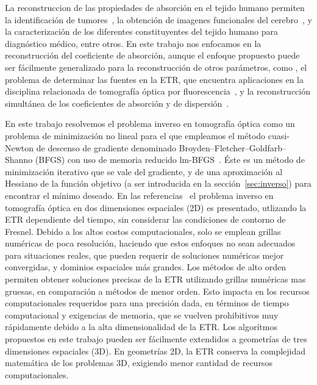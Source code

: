  La reconstruccion de las propiedades de absorción en el tejido humano permiten la identificación de tumores~\cite{Zhu2005, Zhu2010, Fujii2016b},
 la obtención de imagenes funcionales del cerebro~\cite{Boas2001, bluestone2001, Arridge1999}, y la caracterización de los diferentes
 constituyentes del tejido humano para diagnóstico médico, entre otros. En este trabajo nos enfocamos en
 la reconstrucción del coeficiente de absorción, aunque
 el enfoque propuesto puede ser fácilmente generalizado para la reconstrucción 
 de otros parámetros, como \eg, el problema de determinar las fuentes en la ETR,
 que encuentra aplicaciones en la disciplina relacionada de
 tomografía óptica por fluorescencia~\cite{Klose2005,Klose2010, Ren2010}, y la reconstrucción 
 simultánea de los coeficientes de absorción y de dispersión~\cite{Ren2006,Prieto2017}.

 En este trabajo resolvemos el problema inverso en tomografía óptica como un problema 
 de minimización no lineal para el que empleamos
 el método cuasi-Newton de descenso de gradiente denominado 
 Broyden–Fletcher–Goldfarb–Shanno (BFGS) con uso de memoria reducido lm-BFGS~\cite{Byrd1995}. Éste es un método de minimización iterativo 
 que se vale del gradiente, y de una aproximación 
 al Hessiano de la función objetivo (a ser 
 introducida en la sección~\ref{sec:inverso}) para encontrar el mínimo deseado. En las referencias~\cite{Prieto2017,Boulanger2005} 
 el problema inverso en tomografía óptica en dos dimensiones espaciales (2D)
es presentado, utlizando la ETR dependiente del tiempo, sin considerar las condiciones de contorno de Fresnel. Debido a los altos costos computacionales,
 solo se emplean grillas numéricas de poca resolución,
 haciendo que estos enfoques no sean adecuados para situaciones reales, que pueden requerir
 de soluciones numéricas mejor convergidas, y dominios espaciales más grandes. 
 Los métodos de alto orden
 permiten obtener soluciones precisas de la ETR
 utilizando grillas numéricas mas gruesas, en comparación a métodos de menor orden. Esto impacta en los recursos computacionales requeridos para una precisión dada, en términos de tiempo computacional y exigencias de memoria, que se vuelven prohibitivos muy rápidamente debido a la alta dimensionalidad de la ETR. Los algorítmos propuestos 
 en este trabajo pueden ser fácilmente extendidos a geometrías de tres dimensiones espaciales (3D). En geometrías 2D, la ETR
 conserva la complejidad matemática de los problemas 3D, 
 exigiendo menor cantidad de recursos computacionales.

